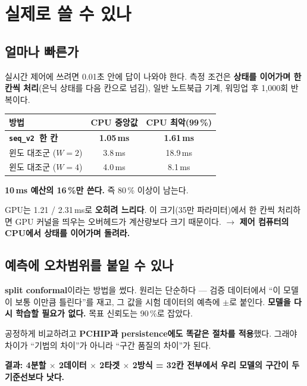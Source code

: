 \documentclass[10pt]{article}
\newcommand{\seqv}{\texttt{seq\_v2}}
\begin{document}
\section{실제로 쓸 수 있나}

\subsection{얼마나 빠른가}

실시간 제어에 쓰려면 0.01초 안에 답이 나와야 한다. 측정 조건은 \textbf{상태를 이어가며
한 칸씩 처리}(은닉 상태를 다음 칸으로 넘김), 일반 노트북급 기계, 워밍업 후 1{,}000회 반복이다.

\begin{center}
\begin{tabular}{@{}lcc@{}}
\toprule
\textbf{방법} & \textbf{CPU 중앙값} & \textbf{CPU 최악(99\,\%)} \\
\midrule
\textbf{\seqv\ 한 칸} & \textbf{1.05\,ms} & \textbf{1.61\,ms} \\
윈도 대조군 ($W=2$) & 3.8\,ms & 18.9\,ms \\
윈도 대조군 ($W=4$) & 4.0\,ms & 8.1\,ms \\
\bottomrule
\end{tabular}
\end{center}

\textbf{10\,ms 예산의 16\,\%만 쓴다.} 즉 80\,\% 이상이 남는다.

GPU는 1.21 / 2.31\,ms로 \textbf{오히려 느리다}. 이 크기(35만 파라미터)에서 한 칸씩 처리하면
GPU 커널을 띄우는 오버헤드가 계산량보다 크기 때문이다. $\rightarrow$ \textbf{제어 컴퓨터의
CPU에서 상태를 이어가며 돌려라.}

\subsection{예측에 오차범위를 붙일 수 있나}

\textbf{split conformal}이라는 방법을 썼다. 원리는 단순하다 --- 검증 데이터에서 ``이 모델이
보통 이만큼 틀린다''를 재고, 그 값을 시험 데이터의 예측에 $\pm$로 붙인다. \textbf{모델을
다시 학습할 필요가 없다.} 목표 신뢰도는 90\,\%로 잡았다.

공정하게 비교하려고 \textbf{PCHIP과 persistence에도 똑같은 절차를 적용}했다. 그래야 차이가
``기법의 차이''가 아니라 ``구간 품질의 차이''가 된다.

\textbf{결과: 4분할 $\times$ 2데이터 $\times$ 2타겟 $\times$ 2방식 = 32칸 전부에서 우리
모델의 구간이 두 기준선보다 낫다.}
\end{document}
